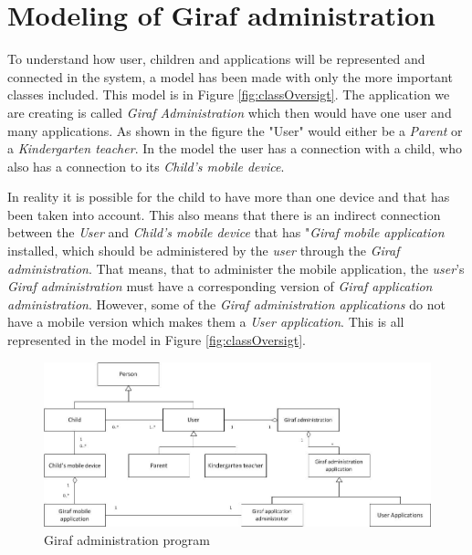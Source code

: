 \section{Modeling of Giraf administration}
To understand how user, children and applications will be represented and connected in the system, a model  has been made with only the more important classes included. This model is in Figure \vref{fig:classOversigt}. The application we are creating is called \textit{Giraf Administration} which then would have one user and many applications. As shown in the figure the "User" would either be a \textit{Parent} or a \textit{Kindergarten teacher}. In the model the user has a connection with a child, who also has a connection to its \textit{Child's mobile device}.

In reality it is possible for the child to have more than one device and that has been taken into account. This also means that there is an indirect connection between the \textit{User} and \textit{Child's mobile device} that has "\textit{Giraf mobile application} installed, which should be administered by the \textit{user} through the \textit{Giraf administration}. That means, that to administer the mobile application, the \textit{user}'s \textit{Giraf administration} must have a corresponding version of \textit{Giraf application administration}. However, some of the \textit{Giraf administration applications} do not have a mobile version which makes them a \textit{User application}. This is all represented in the model in Figure \vref{fig:classOversigt}.


\begin{figure}[!ht]
	\centering
		\includegraphics[width=1.00\textwidth]{img/classOversigt.jpg}
	\caption{Giraf administration program}
	\label{fig:classOversigt}
\end{figure}
\newpage